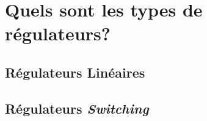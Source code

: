 
\section{Quels sont les types de régulateurs?}

\subsection{Régulateurs Linéaires}
\subsection{Régulateurs \textit{Switching}}